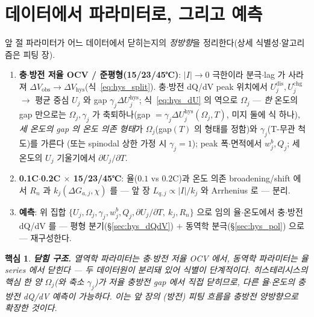 \documentclass[11pt,a4paper]{article}
\newtheorem*{keybox}{핵심}
\newcommand{\dis}{\mathrm{dis}}
\newcommand{\chg}{\mathrm{chg}}
\newcommand{\hys}{\mathrm{hys}}
\newcommand{\obs}{\mathrm{obs}}
\begin{document}
\section{데이터에서 파라미터로, 그리고 예측}\label{sec:hys_fit}
앞 절 파라미터가 어느 데이터에서 닫히는지의 \emph{정방향}을 정리한다(상세 식별성$\cdot$알고리즘은 피팅 장).
\begin{enumerate}[label=\arabic*),leftmargin=2.0em,itemsep=2pt]
\item \textbf{충$\cdot$방전 저율 OCV / 준평형(15/23/45℃)}: $|I|\to0$ 극한이라 분극$\cdot$lag 가 사라져
$\Delta V_\obs\to\Delta V_\hys$(식~\eqref{eq:hys_split}). 충$\cdot$방전 dQ/dV peak 위치에서 $U_j^\dis,U_j^\chg$
$\to$ 평균 중심 $U_j$ 와 gap $\gamma_j\Delta U_j^\hys$; 식~\eqref{eq:hys_dU} 의 역으로 $\Omega_j$ — \emph{한}
온도의 gap 만으로는 $\Omega_j,\gamma_j$ 가 축퇴하나(gap $=\gamma_j\Delta U_j^\hys(\Omega_j,T)$, 미지 둘에 식 하나),
\emph{세 온도의 gap 의 온도 의존 형태}가 $\Omega_j$(gap$(T)$ 의 형태를 정함)와 $\gamma_j$(T-무관 척도)를 가른다
(또는 spinodal 상한 가정 시 $\gamma_j=1$); peak 폭$\cdot$면적에서 $w_j^b,Q_j$; 세 온도의 $U_j$ 기울기에서
$\partial U_j/\partial T$.
\item \textbf{0.1C$\cdot$0.2C $\times$ 15/23/45℃}: 율($0.1$ vs $0.2$C)과 온도 의존 broadening/shift 에서
$R_n$ 과 $k_j(\Delta G_{a,j},\chi)$ 를 — 앞 장 $L_{q,j}\propto|I|/k_j$ 와 Arrhenius 로 — 분리.
\item \textbf{예측}: 위 집합 $\{U_j,\Omega_j,\gamma_j,w_j^b,Q_j,\partial U_j/\partial T,\ k_j,R_n\}$ 으로 임의
율$\cdot$온도에서 충$\cdot$방전 dQ/dV 를 — 평형 분기(\S\ref{sec:hys_dQdV}) $+$ 동역학 분극(\S\ref{sec:hys_pol})
으로 — 재구성한다.
\end{enumerate}
\begin{keybox}
\textbf{닫힘 구조.} 열역학 파라미터는 \emph{충$\cdot$방전 저율 OCV} 에서, 동역학 파라미터는 \emph{율 series}
에서 닫힌다 — 두 데이터원이 분리돼 있어 식별이 단계적이다. 히스테리시스의 핵심 한 양 $\Omega_j$(와 축소
$\gamma_j$)가 저율 충방전 gap 에서 직접 닫히므로, 다른 율$\cdot$온도의 충방전 dQ/dV 예측이 가능하다. 이는 앞
장의 (방전) 피팅 흐름을 충방전 양방향으로 \emph{확장}한 것이다.
\end{keybox}

\end{document}
